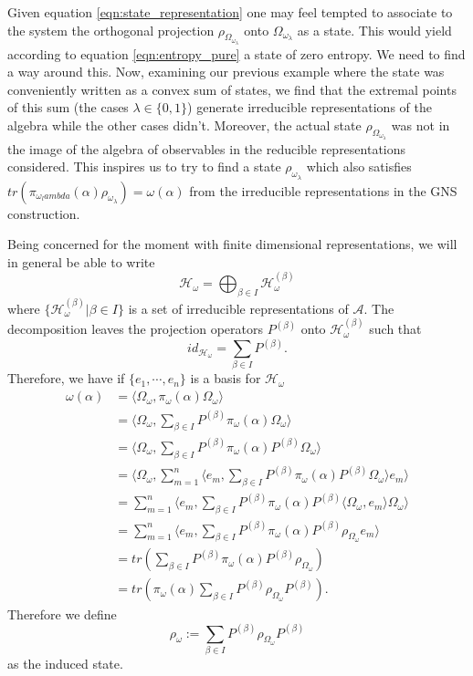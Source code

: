 Given equation \ref{eqn:state_representation} one may feel tempted to associate to the system the orthogonal projection $\rho_{\Omega_{\omega_\lambda}}$ onto $\Omega_{\omega_\lambda}$ as a state. This would yield according to equation \ref{eqn:entropy_pure} a state of zero entropy. We need to find a way around this. Now, examining our previous example where the state was conveniently written as a convex sum of states, we find that the extremal points of this sum (the cases $\lambda\in\{0,1\}$) generate irreducible representations of the algebra while the other cases didn't. Moreover, the actual state $\rho_{\Omega_{\omega_\lambda}}$ was not in the image of the algebra of observables in the reducible representations considered. This inspires us to try to find a state $\rho_{\omega_\lambda}$ which also satisfies $tr(\pi_{\omega_lambda}(\alpha)\rho_{\omega_\lambda})=\omega(\alpha)$ from the irreducible representations in the GNS construction.

Being concerned for the moment with finite dimensional representations, we will in general be able to write
\begin{equation}
\mathcal{H}_\omega = \bigoplus_{\beta\in I}\mathcal{H}_\omega^{(\beta)}
\end{equation}
where $\{\mathcal{H}_\omega^{(\beta)}|\beta\in I\}$ is a set of irreducible representations of $\mathcal{A}$. The decomposition leaves the projection operators $P^{(\beta)}$ onto $\mathcal{H}_\omega^{(\beta)}$ such that
\begin{equation}
id_{\mathcal{H}_\omega}=\sum_{\beta\in I}P^{(\beta)}.
\end{equation}
Therefore, we have if $\{e_1,\cdots,e_n\}$ is a basis for $\mathcal{H}_\omega$
\begin{align}
\omega(\alpha)&=\langle \Omega_\omega, \pi_\omega(\alpha)\Omega_\omega\rangle \\
&=\langle\Omega_\omega,\sum_{\beta\in I}P^{(\beta)}\pi_\omega(\alpha)\Omega_\omega\rangle \\
&=\langle\Omega_\omega,\sum_{\beta\in I}P^{(\beta)}\pi_\omega(\alpha)P^{(\beta)}\Omega_\omega\rangle \\
&=\langle\Omega_\omega,\sum_{m=1}^n\langle e_m,\sum_{\beta\in I}P^{(\beta)}\pi_\omega(\alpha) P^{(\beta)}\Omega_\omega\rangle e_m\rangle \\
&=\sum_{m=1}^n\langle e_m,\sum_{\beta\in I}P^{(\beta)}\pi_\omega(\alpha) P^{(\beta)}\langle\Omega_\omega, e_m\rangle\Omega_\omega\rangle \\
&=\sum_{m=1}^n\langle e_m,\sum_{\beta\in I}P^{(\beta)}\pi_\omega(\alpha) P^{(\beta)}\rho_{\Omega_\omega} e_m\rangle \\
&=tr(\sum_{\beta\in I}P^{(\beta)}\pi_\omega(\alpha) P^{(\beta)}\rho_{\Omega_\omega})\\
&=tr(\pi_\omega(\alpha)\sum_{\beta\in I}P^{(\beta)}\rho_{\Omega_\omega} P^{(\beta)}).
\end{align}
Therefore we define
\begin{equation}
\rho_\omega := \sum_{\beta\in I}P^{(\beta)}\rho_{\Omega_\omega} P^{(\beta)}
\end{equation}
as the induced state.

